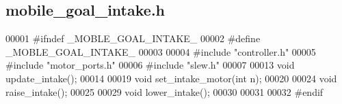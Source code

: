 \subsection{mobile\+\_\+goal\+\_\+intake.\+h}
\label{a00047_source}

\begin{DoxyCode}
00001 \textcolor{preprocessor}{#ifndef \_MOBLE\_GOAL\_INTAKE\_}
00002 \textcolor{preprocessor}{#define \_MOBLE\_GOAL\_INTAKE\_}
00003 
00004 \textcolor{preprocessor}{#include "controller.h"}
00005 \textcolor{preprocessor}{#include "motor_ports.h"}
00006 \textcolor{preprocessor}{#include "slew.h"}
00007 
00013 \textcolor{keywordtype}{void} update_intake();
00014 
00019 \textcolor{keywordtype}{void} set_intake_motor(\textcolor{keywordtype}{int} n);
00020 
00024 \textcolor{keywordtype}{void} raise_intake();
00025 
00029 \textcolor{keywordtype}{void} lower_intake();
00030 
00031 
00032 \textcolor{preprocessor}{#endif}
\end{DoxyCode}
